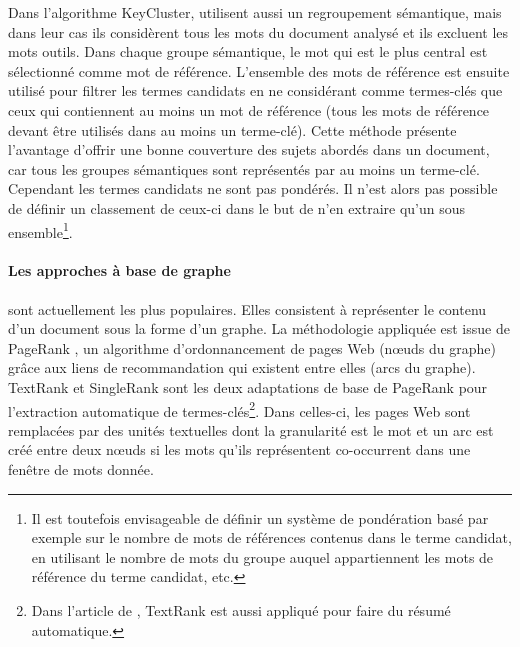         Dans l'algorithme KeyCluster,  \citet{liu2009keycluster} utilisent aussi
        un regroupement sémantique, mais dans leur cas ils considèrent tous les
        mots du document analysé et ils excluent les mots outils. Dans chaque
        groupe sémantique, le mot qui est le plus central est sélectionné comme
        mot de référence. L'ensemble des mots de référence est ensuite utilisé
        pour filtrer les termes candidats en ne considérant comme termes-clés que
        ceux qui contiennent au moins un mot de référence (tous les mots de
        référence devant être utilisés dans au moins un terme-clé). Cette méthode
        présente l'avantage d'offrir une bonne couverture des sujets abordés dans
        un document, car tous les groupes sémantiques sont représentés par au
        moins un terme-clé. Cependant les termes candidats ne sont pas pondérés.
        Il n'est alors pas possible de définir un classement de ceux-ci dans le
        but de n'en extraire qu'un sous ensemble\footnote{Il est toutefois
        envisageable de définir un système de pondération basé par exemple sur le
        nombre de mots de références contenus dans le terme candidat, en utilisant le
        nombre de mots du groupe auquel appartiennent les mots de référence du
        terme candidat, etc.}.

      \paragraph{Les approches à base de graphe}
        sont actuellement les plus populaires. Elles consistent à représenter le
        contenu d'un document sous la forme d'un graphe. La méthodologie appliquée
        est issue de PageRank \citep{brin1998pagerank}, un algorithme
        d'ordonnancement de pages Web (n\oe{}uds du graphe) grâce aux liens de
        recommandation qui existent entre elles (arcs du graphe). TextRank
        \citep{mihalcea2004textrank} et SingleRank \citep{wan2008expandrank} sont
        les deux adaptations de base de PageRank pour l'extraction automatique de
        termes-clés\footnote{Dans l'article de \citet{mihalcea2004textrank},
        TextRank est aussi appliqué pour faire du résumé automatique.}. Dans
        celles-ci, les pages Web sont remplacées par des unités textuelles dont la
        granularité est le mot et un arc est créé entre deux n\oe{}uds si les mots
        qu'ils représentent co-occurrent dans une fenêtre de mots donnée.
      
